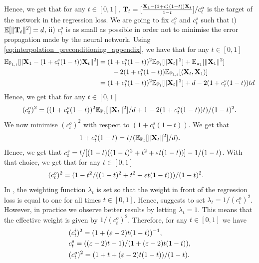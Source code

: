 \documentclass{article}
\begin{document}
Hence, we get that for any $t \in [0,1]$, $\mathbf{T}_t = [\tfrac{\mathbf{X}_1 - (1 + c_t^s(1-t))\mathbf{X}_t}{1-t}]/c_t^o$ is the target of the network in the regression loss. We are going to fix $c_t^o$ and $c_t^s$ such that i) $\mathbb{E}[\| \mathbf{T}_t \|^2] = d$, ii) $c_t^o$ is as small as possible in order not to minimise the error propagation made by the neural network. 
Using \eqref{eq:interpolation_preconditioning_appendix}, we have that for any $t \in [0,1]$
\begin{align}
    \mathbb{E}_{\mathbb{P}_{1,t}}[\| \mathbf{X}_1 - (1 + c_t^s(1-t)) \mathbf{X}_t \|^2] &= (1 + c_t^s(1-t))^2 \mathbb{E}_{\mathbb{P}_t}[\| \mathbf{X}_t \|^2]   + \mathbb{E}_{\pi_1}[\| \mathbf{X}_1 \|^2] \\
    & \qquad - 2(1+c_t^s(1-t))\mathbb{E}_{\mathbb{P}_{1,t}}[\langle \mathbf{X}_t, \mathbf{X}_1 \rangle] \\
    &= (1 + c_t^s(1-t))^2 \mathbb{E}_{\mathbb{P}_t}[\| \mathbf{X}_t \|^2] + d - 2(1+c_t^s(1-t)) t d 
\end{align}
Hence, we get that for any $t \in [0,1]$
\begin{equation}
    (c_t^o)^2 = ((1 + c_t^s(1-t))^2 \mathbb{E}_{\mathbb{P}_t}[ \| \mathbf{X}_t \|^2]/d + 1 - 2(1+c_t^s(1-t)) t) / (1-t)^2 . 
\end{equation}
We now minimise $(c_t^o)^2$ with respect to $(1+c_t^s(1-t))$. We get that 
\begin{equation}
    1 + c_t^s(1-t) = t / (\mathbb{E}_{\mathbb{P}_t}[ \| \mathbf{X}_t \|^2] /d) .
\end{equation}
Hence, we get that $c_t^s = t/[(1-t)((1-t)^2 + t^2 + \varepsilon t (1-t))]-1/(1-t)$. With that choice, we get that for any $t \in [0,1]$
\begin{align}
    (c_t^o)^2 &= (1 - t^2/((1-t)^2 + t^2 + \varepsilon t (1-t)))/(1-t)^2 . 
\end{align}
    In \cite{karras2022elucidating}, the weighting function $\lambda_t$ is set so that the weight in front of the regression loss is equal to one for all times $t \in [0,1]$. Hence, \cite{karras2022elucidating} suggests to set $\lambda_t = 1 / (c_t^o)^2$. However, in practice we observe better results by letting $\lambda_t = 1$. This means that the effective weight is given by $1/(c_t^o)^2$. Therefore, for any $t \in [0,1]$ we have 
    \begin{align}
        &(c_t^i)^2 = (1 + (\varepsilon -2)t(1-t))^{-1} , \\
        &c_t^s = ((\varepsilon - 2)t - 1) / (1 + (\varepsilon - 2)t(1-t)) , \\
        &(c_t^o)^2 = (1 + t + (\varepsilon - 2)t (1-t)) / (1 - t) . 
    \end{align}
    
\end{document}
